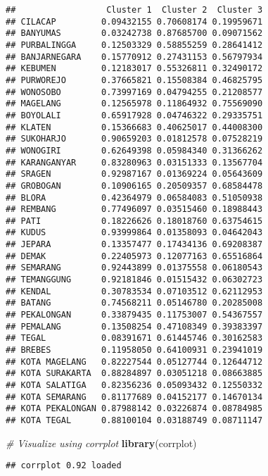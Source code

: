 \documentclass[
]{elegantbook}
\newenvironment{Shaded}{\begin{snugshade}}{\end{snugshade}}
\newcommand{\AttributeTok}[1]{\textcolor[rgb]{0.13,0.29,0.53}{#1}}
\newcommand{\CommentTok}[1]{\textcolor[rgb]{0.56,0.35,0.01}{\textit{#1}}}
\newcommand{\ConstantTok}[1]{\textcolor[rgb]{0.56,0.35,0.01}{#1}}
\newcommand{\FunctionTok}[1]{\textcolor[rgb]{0.13,0.29,0.53}{\textbf{#1}}}
\newcommand{\NormalTok}[1]{#1}
\newcommand{\SpecialCharTok}[1]{\textcolor[rgb]{0.81,0.36,0.00}{\textbf{#1}}}
\begin{document}
\begin{verbatim}
##                  Cluster 1  Cluster 2  Cluster 3
## CILACAP         0.09432155 0.70608174 0.19959671
## BANYUMAS        0.03242738 0.87685700 0.09071562
## PURBALINGGA     0.12503329 0.58855259 0.28641412
## BANJARNEGARA    0.15770912 0.27431153 0.56797934
## KEBUMEN         0.12183017 0.55326811 0.32490172
## PURWOREJO       0.37665821 0.15508384 0.46825795
## WONOSOBO        0.73997169 0.04794255 0.21208577
## MAGELANG        0.12565978 0.11864932 0.75569090
## BOYOLALI        0.65917928 0.04746322 0.29335751
## KLATEN          0.15366683 0.40625017 0.44008300
## SUKOHARJO       0.90659203 0.01812578 0.07528219
## WONOGIRI        0.62649398 0.05984340 0.31366262
## KARANGANYAR     0.83280963 0.03151333 0.13567704
## SRAGEN          0.92987167 0.01369224 0.05643609
## GROBOGAN        0.10906165 0.20509357 0.68584478
## BLORA           0.42364979 0.06584083 0.51050938
## REMBANG         0.77496097 0.03515460 0.18988443
## PATI            0.18226626 0.18018760 0.63754615
## KUDUS           0.93999864 0.01358093 0.04642043
## JEPARA          0.13357477 0.17434136 0.69208387
## DEMAK           0.22405973 0.12077163 0.65516864
## SEMARANG        0.92443899 0.01375558 0.06180543
## TEMANGGUNG      0.92181846 0.01515432 0.06302723
## KENDAL          0.30783534 0.07103512 0.62112953
## BATANG          0.74568211 0.05146780 0.20285008
## PEKALONGAN      0.33879435 0.11753007 0.54367557
## PEMALANG        0.13508254 0.47108349 0.39383397
## TEGAL           0.08391671 0.61445746 0.30162583
## BREBES          0.11958050 0.64100931 0.23941019
## KOTA MAGELANG   0.82227544 0.05127744 0.12644712
## KOTA SURAKARTA  0.88284897 0.03051218 0.08663885
## KOTA SALATIGA   0.82356236 0.05093432 0.12550332
## KOTA SEMARANG   0.81177689 0.04152177 0.14670134
## KOTA PEKALONGAN 0.87988142 0.03226874 0.08784985
## KOTA TEGAL      0.88100104 0.03188749 0.08711147
\end{verbatim}

\begin{Shaded}
\begin{Highlighting}[]
\CommentTok{\# Visualize using corrplot}
\FunctionTok{library}\NormalTok{(corrplot)}
\end{Highlighting}
\end{Shaded}

\begin{verbatim}
## corrplot 0.92 loaded
\end{verbatim}

\begin{Shaded}
\end{Shaded}
\end{document}
